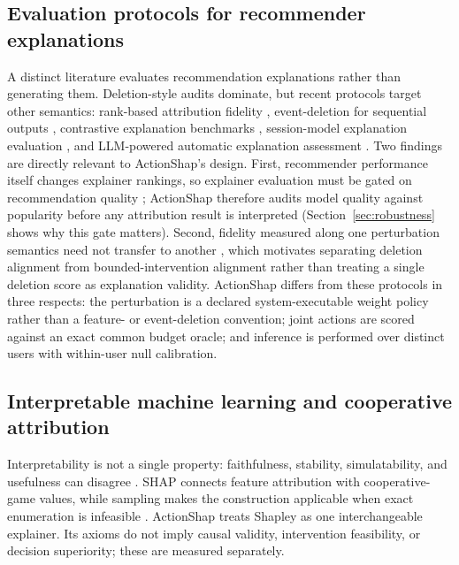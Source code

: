 \documentclass[pdflatex,sn-mathphys-num]{sn-jnl}
\theoremstyle{thmstyleone}
\theoremstyle{thmstyletwo}
\theoremstyle{thmstylethree}
\begin{document}
\subsection{Evaluation protocols for recommender explanations}
A distinct literature evaluates recommendation explanations rather than generating them. Deletion-style audits dominate, but recent protocols target other semantics: rank-based attribution fidelity \cite{chowdhury2024rankshap,pliatsika2025sharpl}, event-deletion for sequential outputs \cite{bento2021timeshap}, contrastive explanation benchmarks \cite{mousavi2023clime}, session-model explanation evaluation \cite{bruun2025session}, and LLM-powered automatic explanation assessment \cite{li2025alert}. Two findings are directly relevant to ActionShap's design. First, recommender performance itself changes explainer rankings, so explainer evaluation must be gated on recommendation quality \cite{mohammadi2024recsys}; ActionShap therefore audits model quality against popularity before any attribution result is interpreted (Section~\ref{sec:robustness} shows why this gate matters). Second, fidelity measured along one perturbation semantics need not transfer to another \cite{baklanov2025fidelity,barkan2026spinrec}, which motivates separating deletion alignment from bounded-intervention alignment rather than treating a single deletion score as explanation validity. ActionShap differs from these protocols in three respects: the perturbation is a declared system-executable weight policy rather than a feature- or event-deletion convention; joint actions are scored against an exact common budget oracle; and inference is performed over distinct users with within-user null calibration.

\subsection{Interpretable machine learning and cooperative attribution}
Interpretability is not a single property: faithfulness, stability, simulatability, and usefulness can disagree \cite{gilpin2018,arrieta2020,molnar2022,samek2017,deyoung2020}. SHAP connects feature attribution with cooperative-game values, while sampling makes the construction applicable when exact enumeration is infeasible \cite{shapley1953,castro2009,lundberg2020,covert2021}. ActionShap treats Shapley as one interchangeable explainer. Its axioms do not imply causal validity, intervention feasibility, or decision superiority; these are measured separately.
\end{document}
